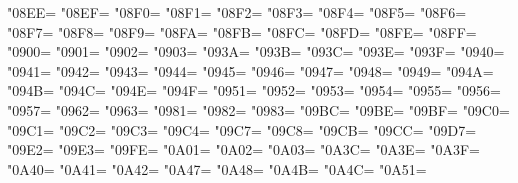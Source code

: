 \XeTeXcharclass"08EE=\KclassCM
\XeTeXcharclass"08EF=\KclassCM
\XeTeXcharclass"08F0=\KclassCM
\XeTeXcharclass"08F1=\KclassCM
\XeTeXcharclass"08F2=\KclassCM
\XeTeXcharclass"08F3=\KclassCM
\XeTeXcharclass"08F4=\KclassCM
\XeTeXcharclass"08F5=\KclassCM
\XeTeXcharclass"08F6=\KclassCM
\XeTeXcharclass"08F7=\KclassCM
\XeTeXcharclass"08F8=\KclassCM
\XeTeXcharclass"08F9=\KclassCM
\XeTeXcharclass"08FA=\KclassCM
\XeTeXcharclass"08FB=\KclassCM
\XeTeXcharclass"08FC=\KclassCM
\XeTeXcharclass"08FD=\KclassCM
\XeTeXcharclass"08FE=\KclassCM
\XeTeXcharclass"08FF=\KclassCM
\XeTeXcharclass"0900=\KclassCM
\XeTeXcharclass"0901=\KclassCM
\XeTeXcharclass"0902=\KclassCM
\XeTeXcharclass"0903=\KclassCM
\XeTeXcharclass"093A=\KclassCM
\XeTeXcharclass"093B=\KclassCM
\XeTeXcharclass"093C=\KclassCM
\XeTeXcharclass"093E=\KclassCM
\XeTeXcharclass"093F=\KclassCM
\XeTeXcharclass"0940=\KclassCM
\XeTeXcharclass"0941=\KclassCM
\XeTeXcharclass"0942=\KclassCM
\XeTeXcharclass"0943=\KclassCM
\XeTeXcharclass"0944=\KclassCM
\XeTeXcharclass"0945=\KclassCM
\XeTeXcharclass"0946=\KclassCM
\XeTeXcharclass"0947=\KclassCM
\XeTeXcharclass"0948=\KclassCM
\XeTeXcharclass"0949=\KclassCM
\XeTeXcharclass"094A=\KclassCM
\XeTeXcharclass"094B=\KclassCM
\XeTeXcharclass"094C=\KclassCM
\XeTeXcharclass"094E=\KclassCM
\XeTeXcharclass"094F=\KclassCM
\XeTeXcharclass"0951=\KclassCM
\XeTeXcharclass"0952=\KclassCM
\XeTeXcharclass"0953=\KclassCM
\XeTeXcharclass"0954=\KclassCM
\XeTeXcharclass"0955=\KclassCM
\XeTeXcharclass"0956=\KclassCM
\XeTeXcharclass"0957=\KclassCM
\XeTeXcharclass"0962=\KclassCM
\XeTeXcharclass"0963=\KclassCM
\XeTeXcharclass"0981=\KclassCM
\XeTeXcharclass"0982=\KclassCM
\XeTeXcharclass"0983=\KclassCM
\XeTeXcharclass"09BC=\KclassCM
\XeTeXcharclass"09BE=\KclassCM
\XeTeXcharclass"09BF=\KclassCM
\XeTeXcharclass"09C0=\KclassCM
\XeTeXcharclass"09C1=\KclassCM
\XeTeXcharclass"09C2=\KclassCM
\XeTeXcharclass"09C3=\KclassCM
\XeTeXcharclass"09C4=\KclassCM
\XeTeXcharclass"09C7=\KclassCM
\XeTeXcharclass"09C8=\KclassCM
\XeTeXcharclass"09CB=\KclassCM
\XeTeXcharclass"09CC=\KclassCM
\XeTeXcharclass"09D7=\KclassCM
\XeTeXcharclass"09E2=\KclassCM
\XeTeXcharclass"09E3=\KclassCM
\XeTeXcharclass"09FE=\KclassCM
\XeTeXcharclass"0A01=\KclassCM
\XeTeXcharclass"0A02=\KclassCM
\XeTeXcharclass"0A03=\KclassCM
\XeTeXcharclass"0A3C=\KclassCM
\XeTeXcharclass"0A3E=\KclassCM
\XeTeXcharclass"0A3F=\KclassCM
\XeTeXcharclass"0A40=\KclassCM
\XeTeXcharclass"0A41=\KclassCM
\XeTeXcharclass"0A42=\KclassCM
\XeTeXcharclass"0A47=\KclassCM
\XeTeXcharclass"0A48=\KclassCM
\XeTeXcharclass"0A4B=\KclassCM
\XeTeXcharclass"0A4C=\KclassCM
\XeTeXcharclass"0A51=\KclassCM
